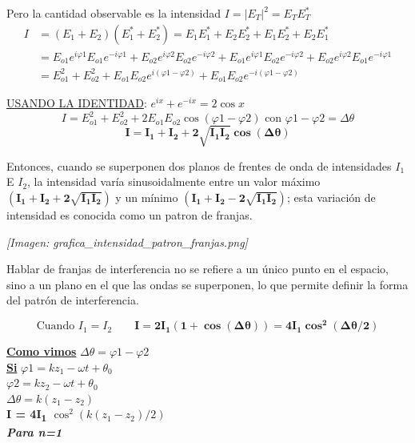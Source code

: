 \documentclass[12pt]{article}
\begin{document}
	Pero la cantidad observable es la intensidad $I = |E_T|^2 = E_T E_T^*$
	\begin{align*}
		I &= (E_1 + E_2)(E_1^* + E_2^*) = E_1 E_1^* + E_2 E_2^* + E_1 E_2^* + E_2 E_1^* \\
		&= E_{o1} e^{i\varphi1} E_{o1} e^{-i\varphi1} + E_{o2} e^{i\varphi2} E_{o2} e^{-i\varphi2} + E_{o1} e^{i\varphi1} E_{o2} e^{-i\varphi2} + E_{o2} e^{i\varphi2} E_{o1} e^{-i\varphi1} \\
		&= E_{o1}^2 + E_{o2}^2 + E_{o1}E_{o2}e^{i(\varphi1 - \varphi2)} + E_{o1}E_{o2}e^{-i(\varphi1 - \varphi2)}
	\end{align*}
	
	\underline{USANDO LA IDENTIDAD}: $e^{ix} + e^{-ix} = 2\cos x$
	\begin{equation*}
		I = E_{o1}^2 + E_{o2}^2 + 2E_{o1}E_{o2}\cos(\varphi1 - \varphi2) \text{ con } \varphi1 - \varphi2 = \Delta\theta
	\end{equation*}
	\begin{equation*}
		\mathbf{I = I_1 + I_2 + 2\sqrt{I_1 I_2} \cos(\Delta\theta)}
	\end{equation*}
	
	Entonces, cuando se superponen dos planos de frentes de onda de intensidades $I_1$ E $I_2$, la intensidad varía sinusoidalmente entre un valor máximo $\mathbf{(I_1 + I_2 + 2\sqrt{I_1 I_2})}$ y un mínimo $\mathbf{(I_1 + I_2 - 2\sqrt{I_1 I_2})}$; esta variación de intensidad es conocida como un patron de franjas.
	
	\textit{[Imagen: grafica\_intensidad\_patron\_franjas.png]}
	
	Hablar de franjas de interferencia no se refiere a un único punto en el espacio, sino a un plano en el que las ondas se superponen, lo que permite definir la forma del patrón de interferencia.
	
	\begin{equation*}
		\text{Cuando } I_1 = I_2 \qquad \mathbf{I = 2I_1 (1 + \cos(\Delta\theta)) = 4I_1 \cos^2(\Delta\theta/2)}
	\end{equation*}
	
	\underline{\textbf{Como vimos}} $\Delta\theta = \varphi1 - \varphi2$ \\
	\underline{\textbf{Si}} $\varphi1 = kz_1 - \omega t + \theta_0$ \\
	$\varphi2 = kz_2 - \omega t + \theta_0$ \\
	$\Delta\theta = k(z_1 - z_2)$ \\
	\textbf{I = 4I\textsubscript{1} $\cos^2(k(z_1 - z_2)/2)$} \\
	\textit{\textbf{Para n=1}}
	
\end{document}
